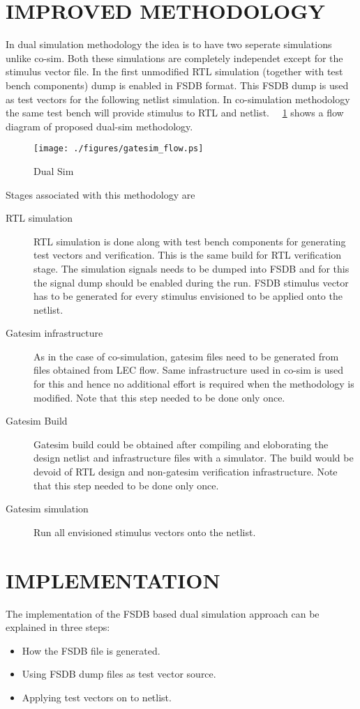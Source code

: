 \section {IMPROVED METHODOLOGY}
In dual simulation methodology the idea is to have two seperate simulations unlike co-sim. Both these simulations are completely independet except for the stimulus vector file. In the first unmodified RTL simulation (together with test bench components) dump is enabled in FSDB format. This FSDB dump is used as test vectors for the following netlist simulation. In co-simulation methodology the same test bench will provide stimulus to RTL and netlist. ~\figurename{~\ref{fig:gatesim_flow.ps}} shows a flow diagram of proposed dual-sim methodology.  
\begin{figure}[h]
\centering
\texttt{[image: ./figures/gatesim\_flow.ps]}
\caption{Dual Sim}
\label{fig:gatesim_flow.ps}
\end{figure}

Stages associated with this methodology are
\begin{description}
	\item[RTL simulation] RTL simulation is done along with test bench components for generating test vectors and verification. This is the same build for RTL verification stage. The simulation signals needs to be dumped into FSDB and for this the signal dump should be enabled during the run. FSDB stimulus vector has to be generated for every stimulus envisioned to be applied onto the netlist.
	\item[Gatesim infrastructure] As in the case of co-simulation, gatesim files need to be generated from files obtained from LEC flow. Same infrastructure used in co-sim is used for this and hence no additional effort is required when the methodology is modified. Note that this step needed to be done only once.
	\item[Gatesim Build] Gatesim build could be obtained after compiling and eloborating the design netlist and infrastructure files with a simulator. The build would be devoid of RTL design and non-gatesim verification infrastructure. Note that this step needed to be done only once.
	\item[Gatesim simulation] Run all envisioned stimulus vectors onto the netlist.
\end{description}


\section{IMPLEMENTATION}
The implementation of the FSDB based dual simulation approach can be explained in three steps:
\begin{itemize}
\item How the FSDB file is generated.
\item Using FSDB dump files as test vector source.
\item Applying test vectors on to netlist.
\end{itemize}

